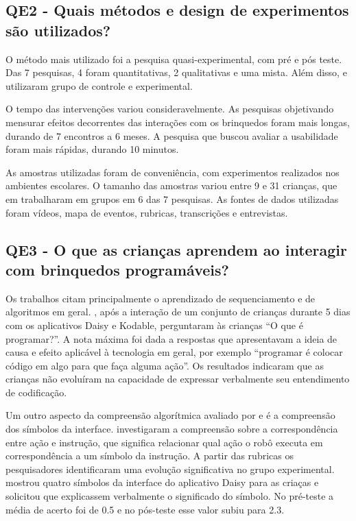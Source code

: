 {\subsection{QE2 - Quais métodos e design de experimentos são utilizados?}

O método mais utilizado foi a pesquisa quasi-experimental, com pré e pós teste. Das 7 pesquisas, 4 foram quantitativas, 2 qualitativas e uma mista. Além disso,  e  utilizaram grupo de controle e experimental.

O tempo das intervenções variou consideravelmente. As pesquisas objetivando mensurar efeitos decorrentes das interações com os brinquedos foram mais longas, durando de 7 encontros a 6 meses. A pesquisa que buscou avaliar a usabilidade foram mais rápidas, durando 10 minutos.

As amostras utilizadas foram de conveniência, com experimentos realizados nos ambientes escolares. O tamanho das amostras variou entre 9 e 31 crianças, que em trabalharam em grupos em 6 das 7 pesquisas. As fontes de dados utilizadas foram vídeos, mapa de eventos, rubricas, transcrições e entrevistas. 

\subsection{QE3 - O que as crianças aprendem ao interagir com brinquedos programáveis?}

Os trabalhos citam principalmente o aprendizado de sequenciamento e de algoritmos em geral. , após a interação de um conjunto de crianças durante 5 dias com os aplicativos Daisy e Kodable, perguntaram às crianças “O que é programar?”. A nota máxima foi dada a respostas que apresentavam a ideia de causa e efeito aplicável à tecnologia em geral, por exemplo “programar é colocar código em algo para que faça alguma ação”. Os resultados indicaram que as crianças não evoluíram na capacidade de expressar verbalmente seu entendimento de codificação.

Um outro aspecto da compreensão algorítmica avaliado por  e  é a compreensão dos símbolos da interface.  investigaram a compreensão sobre a correspondência entre ação e instrução, que significa relacionar qual ação o robô executa em correspondência a um símbolo da instrução. A partir das rubricas os pesquisadores identificaram uma evolução significativa no grupo experimental.  mostrou quatro símbolos da interface do aplicativo Daisy para as criaças e solicitou que explicassem verbalmente o significado do símbolo. No pré-teste a média de acerto foi de 0.5 e no pós-teste esse valor subiu para 2.3.

}
